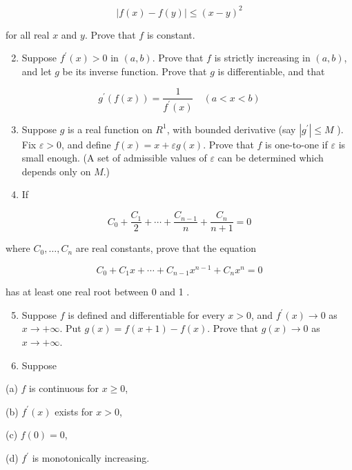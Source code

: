 \documentclass[10pt]{article}
\begin{document}
$$
|f(x)-f(y)| \leq(x-y)^{2}
$$

for all real $x$ and $y$. Prove that $f$ is constant.

\begin{enumerate}
  \setcounter{enumi}{1}
  \item Suppose $f^{\prime}(x)>0$ in $(a, b)$. Prove that $f$ is strictly increasing in $(a, b)$, and let $g$ be its inverse function. Prove that $g$ is differentiable, and that
\end{enumerate}

$$
g^{\prime}(f(x))=\frac{1}{f^{\prime}(x)} \quad(a<x<b)
$$

\begin{enumerate}
  \setcounter{enumi}{2}
  \item Suppose $g$ is a real function on $R^{1}$, with bounded derivative (say $\left|g^{\prime}\right| \leq M$ ). Fix $\varepsilon>0$, and define $f(x)=x+\varepsilon g(x)$. Prove that $f$ is one-to-one if $\varepsilon$ is small enough. (A set of admissible values of $\varepsilon$ can be determined which depends only on $M$.)

  \item If

\end{enumerate}

$$
C_{0}+\frac{C_{1}}{2}+\cdots+\frac{C_{n-1}}{n}+\frac{C_{n}}{n+1}=0
$$

where $C_{0}, \ldots, C_{n}$ are real constants, prove that the equation

$$
C_{0}+C_{1} x+\cdots+C_{n-1} x^{n-1}+C_{n} x^{n}=0
$$

has at least one real root between 0 and 1 .

\begin{enumerate}
  \setcounter{enumi}{4}
  \item Suppose $f$ is defined and differentiable for every $x>0$, and $f^{\prime}(x) \rightarrow 0$ as $x \rightarrow+\infty$. Put $g(x)=f(x+1)-f(x)$. Prove that $g(x) \rightarrow 0$ as $x \rightarrow+\infty$.

  \item Suppose

\end{enumerate}

(a) $f$ is continuous for $x \geq 0$,

(b) $f^{\prime}(x)$ exists for $x>0$,

(c) $f(0)=0$,

(d) $f^{\prime}$ is monotonically increasing.
\end{document}
